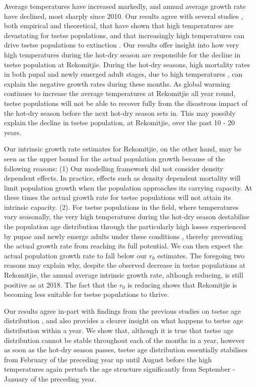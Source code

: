 \documentclass[12pt,a4paper]{article}
\begin{document}
Average temperatures have increased markedly, and annual average growth rate have declined, most sharply since 2010.  Our results agree with several studies \cite{Pagabeleguem2016f,Ackley2017}, both empirical and theoretical, that have shown that high temperatures are devastating for tsetse populations, and that increasingly high temperatures can drive tsetse populations to extinction \cite{Lord2018,Are2019}. Our results offer insight into how very high temperatures during the hot-dry season are responsible for the decline in tsetse population at Rekomitjie. During the hot-dry seasons, high mortality rates in both pupal and newly emerged adult stages, due to high temperatures \cite{Ackley2017}, can explain the negative growth rates during these months.  As global warming continues to increase the average temperatures at Rekomitjie all year round, tsetse populations will not be able to recover fully from the disastrous impact of the hot-dry season before the next hot-dry season sets in. This may possibly explain the decline in tsetse population, at Rekomitjie, over the past 10 - 20 years. 

Our intrinsic growth rate estimates for Rekomitjie, on the other hand, may  be seen as the upper bound for the actual population growth because of the following reasons: (1) Our modelling framework did not consider density dependent effects. In practice, effects such as density dependent mortality will limit population growth when the population approaches its carrying capacity. At these times the actual growth rate for tsetse populations will not attain its intrinsic capacity. (2). For tsetse populations in the field, where temperatures vary seasonally, the very high temperatures during the hot-dry season destabilise the population age distribution through the particularly high losses experienced by pupae and newly emerge adults under these conditions  \cite{VanSickle1988,Hargrove2013b}, thereby preventing the actual growth rate from reaching its full potential. We can then expect the actual population growth rate to fall below our $r_0$ estimates. The foregoing two reasons may explain why, despite the observed decrease in tsetse populations at Rekomitjie, the annual average intrinsic growth rate, although reducing, is still positive as at 2018. The fact that the $r_0$ is reducing shows that Rekomitjie is becoming less suitable for tsetse populations to thrive.

 
Our results agree in-part with findings from the previous studies on tsetse age distribution \cite{VanSickle1988,Hargrove2013b,hargrove2015mortality,Ackley2017},  and also provides a clearer insight on what happens to tsetse age distribution within a year. We show that, although it is true that tsetse age distribution cannot be stable throughout each of the months in a year, however as soon as the hot-dry season passes, tsetse age distribution essentially stabilises from February of the preceding year up until August before the high temperatures again perturb the age structure significantly from September - January of the preceding   year.
\end{document}

